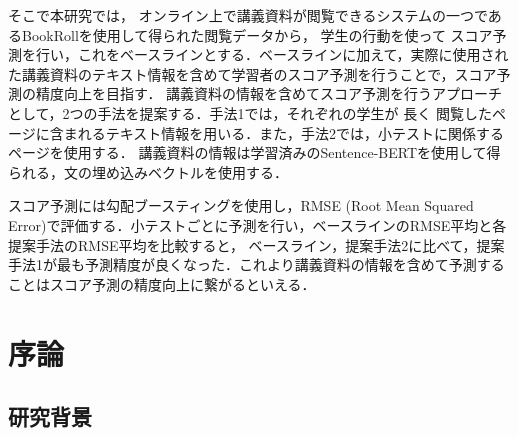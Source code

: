 \documentclass[a4paper,12pt]{ltjsreport}
\begin{document}
そこで本研究では，
オンライン上で講義資料が閲覧できるシステムの一つであるBookRollを使用して得られた閲覧データから，
学生の行動を使って
スコア予測を行い，これをベースラインとする．ベースラインに加えて，実際に使用された講義資料のテキスト情報を含めて学習者のスコア予測を行うことで，スコア予測の精度向上を目指す．
講義資料の情報を含めてスコア予測を行うアプローチとして，2つの手法を提案する．手法1では，それぞれの学生が
長く
閲覧したページに含まれるテキスト情報を用いる．また，手法2では，小テストに関係するページを使用する．
講義資料の情報は学習済みのSentence-BERTを使用して得られる，文の埋め込みベクトルを使用する．

スコア予測には勾配ブースティングを使用し，RMSE (Root Mean Squared Error)で評価する．小テストごとに予測を行い，ベースラインのRMSE平均と各提案手法のRMSE平均を比較すると，
ベースライン，提案手法2に比べて，提案手法1が最も予測精度が良くなった．これより講義資料の情報を含めて予測することはスコア予測の精度向上に繋がるといえる．




\afterpreface

\chapter{序論}

\section{研究背景}\label{sec:haikei}
\end{document}
